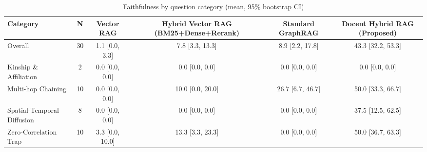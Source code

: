 \begin{table}[htbp]
\centering
\caption{Faithfulness by question category (mean, 95\% bootstrap CI)}
\label{tab:rag_by_category}
\begin{tabular}{l|c|cccc}
\hline
\textbf{Category} & \textbf{N} & \textbf{Vector RAG} & \textbf{Hybrid Vector RAG (BM25+Dense+Rerank)} & \textbf{Standard GraphRAG} & \textbf{Docent Hybrid RAG (Proposed)} \\
\hline
Overall & 30 & 1.1 [0.0, 3.3] & 7.8 [3.3, 13.3] & 8.9 [2.2, 17.8] & 43.3 [32.2, 53.3] \\
Kinship \& Affiliation & 2 & 0.0 [0.0, 0.0] & 0.0 [0.0, 0.0] & 0.0 [0.0, 0.0] & 0.0 [0.0, 0.0] \\
Multi-hop Chaining & 10 & 0.0 [0.0, 0.0] & 10.0 [0.0, 20.0] & 26.7 [6.7, 46.7] & 50.0 [33.3, 66.7] \\
Spatial-Temporal Diffusion & 8 & 0.0 [0.0, 0.0] & 0.0 [0.0, 0.0] & 0.0 [0.0, 0.0] & 37.5 [12.5, 62.5] \\
Zero-Correlation Trap & 10 & 3.3 [0.0, 10.0] & 13.3 [3.3, 23.3] & 0.0 [0.0, 0.0] & 50.0 [36.7, 63.3] \\
\hline
\end{tabular}
\end{table}
